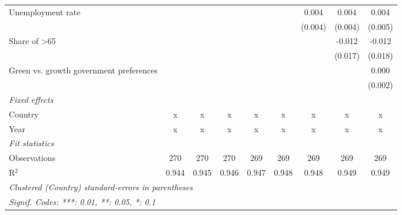 \begin{table}[htbp]
\begin{tabular}{lcccccccc}
      Unemployment rate                           &         &             &         &         &             & 0.004        & 0.004        & 0.004\\   
                                                  &         &             &         &         &             & (0.004)      & (0.004)      & (0.005)\\   
      Share of >65                                &         &             &         &         &             &              & -0.012       & -0.012\\   
                                                  &         &             &         &         &             &              & (0.017)      & (0.018)\\   
      Green vs. growth government preferences     &         &             &         &         &             &              &              & 0.000\\   
                                                  &         &             &         &         &             &              &              & (0.002)\\   
      \emph{Fixed effects}\\
      Country                                     & x       & x           & x       & x       & x           & x            & x            & x\\  
      Year                                        & x       & x           & x       & x       & x           & x            & x            & x\\  
      \midrule \emph{Fit statistics}\\
      Observations                                & 270     & 270         & 270     & 269     & 269         & 269          & 269          & 269\\  
      R$^2$                                       & 0.944   & 0.945       & 0.946   & 0.947   & 0.948       & 0.948        & 0.949        & 0.949\\  
      \midrule
      \multicolumn{9}{l}{\emph{Clustered (Country) standard-errors in parentheses}}\\
      \multicolumn{9}{l}{\emph{Signif. Codes: ***: 0.01, **: 0.05, *: 0.1}}\\
   \end{tabular}
\end{table}



